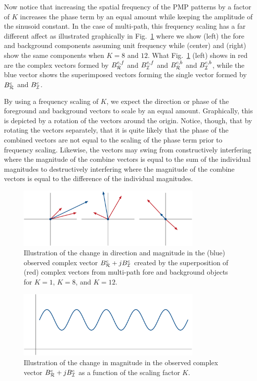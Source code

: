 \documentclass[10pt]{article}
\begin{document}
Now notice that increasing the spatial frequency of the PMP patterns by a factor of $K$ increases the phase term by an equal amount while keeping the amplitude of the sinusoid constant.  In the case of multi-path, this frequency scaling has a far different affect as illustrated graphically in Fig.~\ref{fig00} where we show (left) the fore and background components assuming unit frequency while (center) and (right) show the same components when $K=8$ and $12$.  What Fig.~\ref{fig00} (left) shows in red are the complex vectors formed by $B^{c,f}_{\cal R}$ and $B^{c,f}_{\cal I}$ and $B^{c,b}_{\cal R}$ and $B^{c,b}_{\cal I}$, while the blue vector shows the superimposed vectors forming the single vector formed by $B^c_{\cal R}$ and $B^c_{\cal I}$. 

By using a frequency scaling of $K$, we expect the direction or phase of the foreground and background vectors to scale by an equal amount.  
Graphically, this is depicted by a rotation of the vectors around the origin.  Notice, though, that by rotating the vectors separately, that it is quite likely that the phase of the combined vectors are not equal to the scaling of the phase term prior to frequency scaling.  Likewise, the vectors may swing from constructively interfering where the magnitude of the combine vectors is equal to the sum of the individual magnitudes to destructively interfering where the magnitude of the combine vectors is equal to the difference of the individual magnitudes. 

\begin{figure}[!t]
\centering\includegraphics[width=3.55in]{Figures/figure00}
\caption{Illustration of the change in direction and magnitude in the (blue) observed complex vector ${B^c_{\cal R}}+j{B^c_{\cal I}}$ created by the superposition of (red) complex vectors from multi-path fore and background objects for $K=1$, $K=8$, and $K=12$.}
\label{fig00}
\end{figure}

\begin{figure}[!t]
\centering\includegraphics[width=3.55in]{Figures/figure01}
\caption{Illustration of the change in magnitude in the observed complex vector ${B^c_{\cal R}}+j{B^c_{\cal I}}$ as a function of the scaling factor $K$.}
\label{fig01}
\end{figure}
\end{document}
